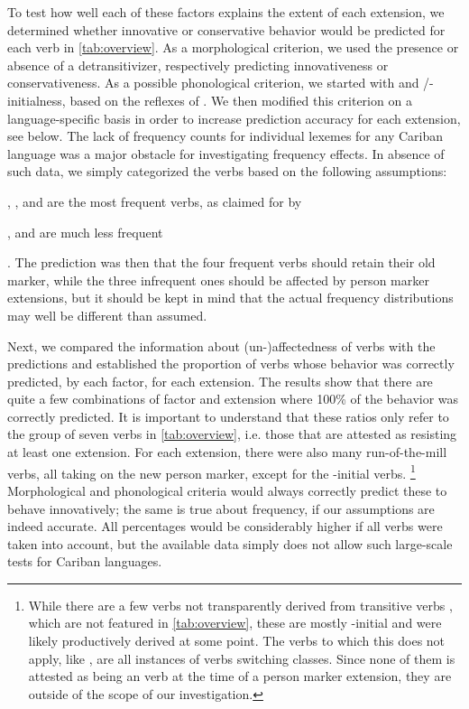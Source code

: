 To test how well each of these factors explains the extent of each extension, we determined whether innovative or conservative behavior would be predicted for each verb in \cref{tab:overview}.
As a morphological criterion, we used the presence or absence of a detransitivizer, respectively predicting innovativeness or conservativeness.
As a possible phonological criterion, we started with  and /-initialness, based on the reflexes of \detrz.
We then modified this criterion on a language-specific basis in order to increase prediction accuracy for each extension, see below.
The lack of frequency counts for individual lexemes for any Cariban language was a major obstacle for investigating frequency effects.
In absence of such data, we simply categorized the verbs based on the following assumptions:
\begin{inlinelist}
	\item {}, , and  are the most frequent  verbs, as claimed for \kalina by \textcite[75]{courtz2008carib}
	\item {},  and  are much less frequent
\end{inlinelist}.
The prediction was then that the four frequent verbs should retain their old marker, while the three infrequent ones should be affected by person marker extensions, but it should be kept in mind that the actual frequency distributions may well be different than assumed.

Next, we compared the information about (un-)affectedness of verbs  with the predictions and established the proportion of verbs whose behavior was correctly predicted, by each factor, for each extension.
The results  show that there are quite a few combinations of factor and extension where 100\% of the behavior was correctly predicted.
It is important to understand that these ratios only refer to the group of seven verbs in \cref{tab:overview}, i.e. those that are attested as resisting at least one extension.
For each extension, there were also many run-of-the-mill  verbs, all taking on the new person marker, except for the \akuriyo {}-initial verbs.%
\footnote{While there are a few  verbs not transparently derived from transitive verbs \parencites[252]{triomeira1999}[222]{meira2000split}[30]{gildea2007greenberg}, which are not featured in \cref{tab:overview}, these are mostly -initial and were likely productively derived at some point.
The verbs to which this does not apply, like \trio {}  \parencites[252]{triomeira1999}, are all instances of  verbs switching classes.
Since none of them is attested as being an  verb at the time of a person marker extension, they are outside of the scope of our investigation.}
Morphological and phonological criteria would always correctly predict these to behave innovatively; the same is true about frequency, if our assumptions are indeed accurate.
All percentages would be considerably higher if all verbs were taken into account, but the available data simply does not allow such large-scale tests for Cariban languages.


